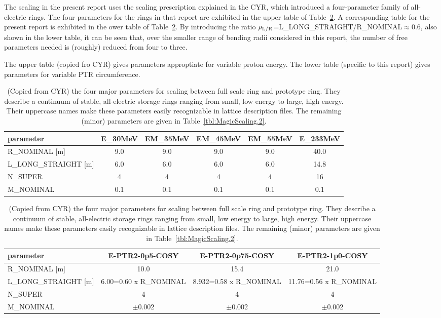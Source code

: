 \documentclass[]{article}
\begin{document}
The scaling in the present report uses the scaling prescription
explained in the CYR, which introduced a four-parameter family of
all-electric rings.  The four parameters for the rings in that report are
exhibited in the upper table of Table~\ref{tbl:MagicScaling}. A corresponding
table for the present report is exhibited in the ower table of 
Table~\ref{tbl:MagicScaling}. By introducing the ratio 
$\rho_{\rm L/R}$=L\_LONG\_STRAIGHT/R\_NOMINAL$\approx0.6$, also shown in the lower table,
it can be seen that, over the smaller range of bending radii considered in this
report, the number of free parameters needed is (roughly) reduced from four to three.
%
\begin{table}[hbp] \scriptsize
\caption{\label{tbl:MagicScaling}(Copied from CYR)
the four major parameters for scaling between full scale ring and prototype ring.
They describe a continuum of stable, all-electric storage rings ranging from small, 
low energy to large, high energy. Their uppercase names make these parameters easily 
recognizable in lattice description files. The remaining (minor) parameters are
given in Table~\ref{tbl:MagicScaling.2}.} The upper table (copied fro CYR) gives
parameters approptiate for variable proton energy. The lower table (specific to this report) 
gives parameters for variable PTR circumference.
\vskip 0.2cm
\centering
\begin{tabular}{|l|c|ccc|c|}  \hline
parameter           & E\_30MeV & EM\_35MeV & EM\_45MeV & EM\_55MeV & E\_233MeV \\ \hline
  R\_NOMINAL [m]      &   9.0    &   9.0     &    9.0    &   9.0     &    40.0   \\
L\_LONG\_STRAIGHT [m] &   6.0    &   6.0     &    6.0    &   6.0     &    14.8   \\ 
   N\_SUPER           &    4     &    4      &     4     &    4      &    16     \\
   M\_NOMINAL         &   0.1    &   0.1     &    0.1    &   0.1     &    0.1    \\ 
 \hline
\end{tabular}
\vskip 0.5cm
\centering
\begin{tabular}{|l|ccc|}  \hline
parameter             & E-PTR2-0p5-COSY         & E-PTR2-0p75-COSY         &  E-PTR2-1p0-COSY        \\ \hline
  R\_NOMINAL [m]      &     10.0                &     15.4                 &      21.0               \\
L\_LONG\_STRAIGHT [m] &  6.00=0.60 x R\_NOMINAL &  8.932=0.58 x R\_NOMINAL & 11.76=0.56 x R\_NOMINAL \\ 
   N\_SUPER           &       4                 &       4                  &        4                \\
   M\_NOMINAL         &    $\pm$0.002           &    $\pm$0.002            &   $\pm$0.002            \\ 
 \hline
\end{tabular}
\end{table}
\end{document}
